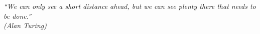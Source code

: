 \begin{epigrafe}
    \vspace*{\fill}
	\begin{flushright}
		\textit{``We can only see a short distance ahead, but we can see plenty there that needs to be done.'' \\
		          (Alan Turing)}
	\end{flushright}
\end{epigrafe}
